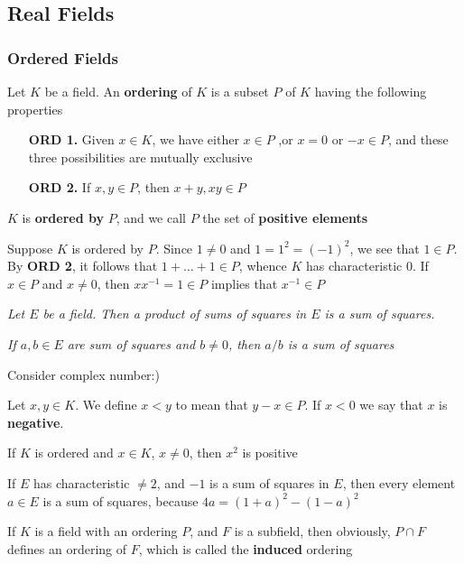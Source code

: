 \documentclass[11pt]{article}
\begin{document}
\subsection{Real Fields}
\label{sec:org521e6f2}
\subsubsection{Ordered Fields}
\label{sec:orge911581}
Let \(K\) be a field. An \textbf{ordering} of \(K\) is a subset \(P\) of \(K\)
having the following properties
\bigskip
\begin{itemize}[itemindent=3em]
\item[\textbf{ORD 1.}] Given \(x\in K\), we have either \(x\in P\) ,or \(x=0\) or
\(-x\in P\), and these three possibilities are mutually exclusive
\item[\textbf{ORD 2.}] If \(x,y\in P\), then \(x+y,xy\in P\)
\end{itemize}

\(K\) is \textbf{ordered by} \(P\), and we call \(P\) the set of \textbf{positive
elements}

Suppose \(K\) is ordered by \(P\). Since \(1\neq0\) and \(1=1^2=(-1)^2\), we
see that \(1\in P\). By \textbf{ORD 2}, it follows that \(1+\dots+1\in P\), whence \(K\)
has characteristic 0. If \(x\in P\) and \(x\neq0\), then \(xx^{-1}=1\in P\) implies
that \(x^{-1}\in P\)

\begin{center}
\emph{Let \(E\) be a field. Then a product of sums of squares in \(E\) is a sum
of squares.}

\emph{If \(a,b\in E\) are sum of squares and \(b\neq0\), then \(a/b\) is a sum of
squares}
\end{center}

Consider complex number:)

Let \(x,y\in K\). We define \(x<y\) to mean that \(y-x\in P\). If \(x<0\) we say
that \(x\) is \textbf{negative}.

If \(K\) is ordered and \(x\in K\), \(x\neq0\), then \(x^2\) is positive

If \(E\) has characteristic \(\neq2\), and \(-1\) is a sum of squares in \(E\),
then every element \(a\in E\) is a sum of squares, because
\(4a=(1+a)^2-(1-a)^2\)

If \(K\) is a field with an ordering \(P\), and \(F\) is a subfield, then
obviously, \(P\cap F\) defines an ordering of \(F\), which is called the
\textbf{induced} ordering
\end{document}
